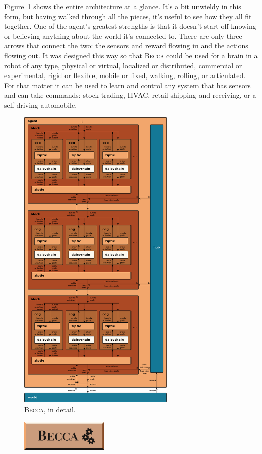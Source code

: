 \documentclass[oneside,twocolumn]{article}
\begin{document}
Figure~\ref{becca} shows the entire architecture at a glance. It's a bit unwieldy in this form, but having walked through all the pieces, it's useful to see how they all fit together. One of the agent's greatest strengths is that it doesn't start off knowing or believing anything about the world it's connected to. There are only three arrows that connect the two: the sensors and reward flowing in and the actions flowing out. It was designed this way so that \textsc{Becca} could be used for a brain in a robot of any type, physical or virtual, localized or distributed, commercial or experimental, rigid or flexible, mobile or fixed, walking, rolling, or articulated. For that matter it can be used to learn and control any system that has sensors and can take commands: stock trading, HVAC, retail shipping and receiving, or a self-driving  automobile.

\begin{figure}[ht]
\centering
\includegraphics[height=15.0cm]{figs/becca.png}
\caption{\textsc{Becca}, in detail.}
\label{becca}
\end{figure}



\begin{figure}[ht]
\centering
\includegraphics[height=1.5cm]{figs/logo_plate.png}
\end{figure}


%
%
\end{document}
